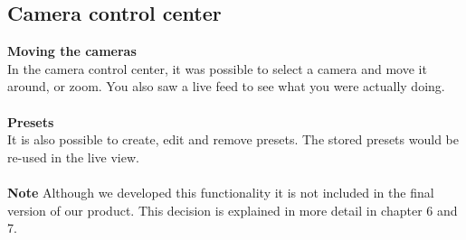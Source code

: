 \subsection{Camera control center}
\textbf{Moving the cameras}\\
In the camera control center, it was possible to select a camera and move it around, or zoom. You also saw a live feed to see what you were actually doing.\\\\
\textbf{Presets}\\
It is also possible to create, edit and remove presets. The stored presets would be re-used in the live view.\\\\
\textbf{Note}
Although we developed this functionality it is not included in the final version of our product. This decision is explained in more detail in chapter 6 and 7.\\\\

